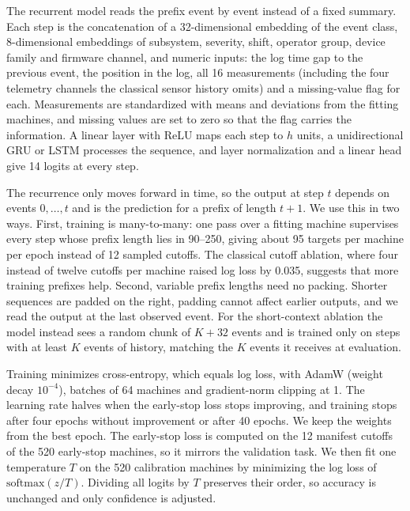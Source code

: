 The recurrent model reads the prefix event by event instead of a fixed summary. Each step is the concatenation of a 32-dimensional embedding of the event class, 8-dimensional embeddings of subsystem, severity, shift, operator group, device family and firmware channel, and numeric inputs: the log time gap to the previous event, the position in the log, all 16 measurements (including the four telemetry channels the classical sensor history omits) and a missing-value flag for each. Measurements are standardized with means and deviations from the fitting machines, and missing values are set to zero so that the flag carries the information. A linear layer with ReLU maps each step to $h$ units, a unidirectional GRU or LSTM processes the sequence, and layer normalization and a linear head give 14 logits at every step.

The recurrence only moves forward in time, so the output at step $t$ depends on events $0,\dots,t$ and is the prediction for a prefix of length $t+1$. We use this in two ways. First, training is many-to-many: one pass over a fitting machine supervises every step whose prefix length lies in 90--250, giving about 95 targets per machine per epoch instead of 12 sampled cutoffs. The classical cutoff ablation, where four instead of twelve cutoffs per machine raised log loss by 0.035, suggests that more training prefixes help. Second, variable prefix lengths need no packing. Shorter sequences are padded on the right, padding cannot affect earlier outputs, and we read the output at the last observed event. For the short-context ablation the model instead sees a random chunk of $K+32$ events and is trained only on steps with at least $K$ events of history, matching the $K$ events it receives at evaluation.

Training minimizes cross-entropy, which equals log loss, with AdamW (weight decay $10^{-4}$), batches of 64 machines and gradient-norm clipping at 1. The learning rate halves when the early-stop loss stops improving, and training stops after four epochs without improvement or after 40 epochs. We keep the weights from the best epoch. The early-stop loss is computed on the 12 manifest cutoffs of the 520 early-stop machines, so it mirrors the validation task. We then fit one temperature $T$ on the 520 calibration machines by minimizing the log loss of $\mathrm{softmax}(z/T)$. Dividing all logits by $T$ preserves their order, so accuracy is unchanged and only confidence is adjusted.
